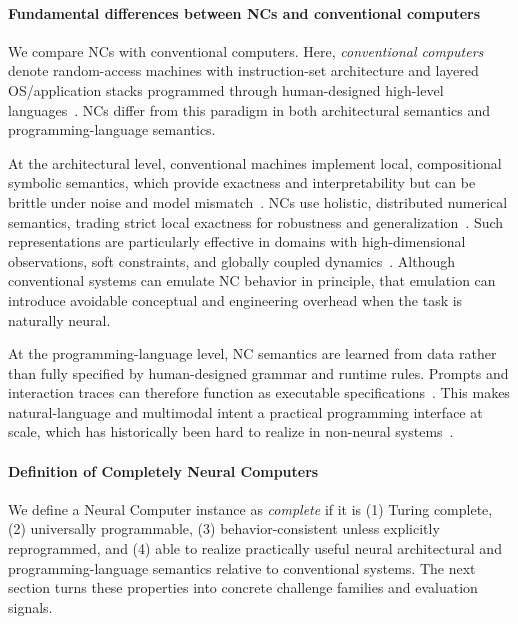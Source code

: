\paragraph{Fundamental differences between NCs and conventional computers}
We compare NCs with conventional computers.
Here, \emph{conventional computers} denote random-access machines with instruction-set architecture and layered OS/application stacks programmed through human-designed high-level languages~\citep{hartmanis1974power,anagnostopoulos1973computer,backus1957fortran,backus1963revised}.
NCs differ from this paradigm in both architectural semantics and programming-language semantics.

At the architectural level, conventional machines implement local, compositional symbolic semantics, which provide exactness and interpretability but can be brittle under noise and model mismatch~\citep{Newell1976,BROOKS1991139}.
NCs use holistic, distributed numerical semantics, trading strict local exactness for robustness and generalization~\citep{Hinton1986,Bishop2006,lecun2015deep}.
Such representations are particularly effective in domains with high-dimensional observations, soft constraints, and globally coupled dynamics~\citep{bengio2013representation,Smolensky1988-SMOOTP-2,silver2017mastering,vaswani2017attention}.
Although conventional systems can emulate NC behavior in principle, that emulation can introduce avoidable conceptual and engineering overhead when the task is naturally neural.

At the programming-language level, NC semantics are learned from data rather than fully specified by human-designed grammar and runtime rules.
Prompts and interaction traces can therefore function as executable specifications~\citep{Reynolds2021}.
This makes natural-language and multimodal intent a practical programming interface at scale, which has historically been hard to realize in non-neural systems~\citep{jm3,wei2023chainofthoughtpromptingelicitsreasoning}.

\paragraph{Definition of Completely Neural Computers}
We define a Neural Computer instance as \emph{complete} if it is (1) Turing complete, (2) universally programmable, (3) behavior-consistent unless explicitly reprogrammed, and (4) able to realize practically useful neural architectural and programming-language semantics relative to conventional systems.
The next section turns these properties into concrete challenge families and evaluation signals.

